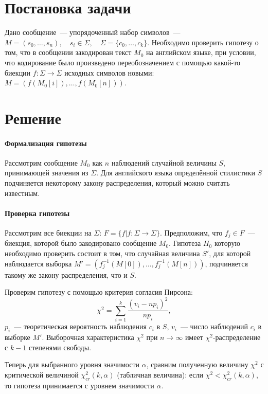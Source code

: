 \documentclass[a4paper,10pt]{article}
\begin{document}
%


\section{Постановка задачи}
Дано сообщение~--- упорядоченный набор символов~--- 
$M = (s_0, \ldots, s_n), \quad s_i \in \Sigma, \quad \Sigma = \{ c_0, \ldots, c_k \}$.
Необходимо проверить гипотезу о том, что в сообщении закодирован текст $M_0$
на английском языке, при условии, что кодирование было произведено 
переобозначением с помощью какой-то биекции 
$f \colon \Sigma \rightarrow \Sigma$ 
исходных символов новыми: 
$M = (f(M_0[i]), \ldots, f(M_0[n]))$.

\section{Решение}
\paragraph{Формализация гипотезы}
Рассмотрим сообщение $M_0$ как $n$ наблюдений случайной величины $S$, 
принимающей значения из $\Sigma$.
Для английского языка определённой стилистики $S$ подчиняется некоторому
закону распределения, который можно считать известным.

\paragraph{Проверка гипотезы}
Рассмотрим все биекции на $\Sigma$: 
$F = \{ f | f \colon \Sigma \rightarrow \Sigma \}$.
Предположим, что $f_j \in F$~--- биекция, которой было закодировано сообщение 
$M_0$.
Гипотеза $H_0$ которую необходимо проверить состоит в том, 
что случайная величина $S'$, для которой наблюдается выборка 
$M' = (f_j^{-1}(M[0]), \ldots, f_j^{-1}(M[n]))$,
подчиняется такому же закону распределения, что и $S$.

Проверим гипотезу с помощью критерия согласия Пирсона:
$$ \chi^2 = \sum_{i=1}^{k}\frac{(v_i - n p_i)^2}{n p_i}, $$
$p_i$~--- теоретическая вероятность наблюдения $c_i$ в $S$,
$v_i$~--- число наблюдений $c_i$ в выборке $M'$.
Выборочная характеристика $\chi^2$ при $n \rightarrow \infty$ имеет 
$\chi^2$-распределение с $k - 1$ степенями свободы.

Теперь для выбранного уровня значимости $\alpha$, сравним полученную величину
$\chi^2$ с критической величиной $\chi^2_{cr}(k, \alpha)$ (табличная величина): 
если $\chi^2 < \chi^2_{cr}(k, \alpha)$, то гипотеза принимается 
с уровнем значимости $\alpha$.
\end{document}
